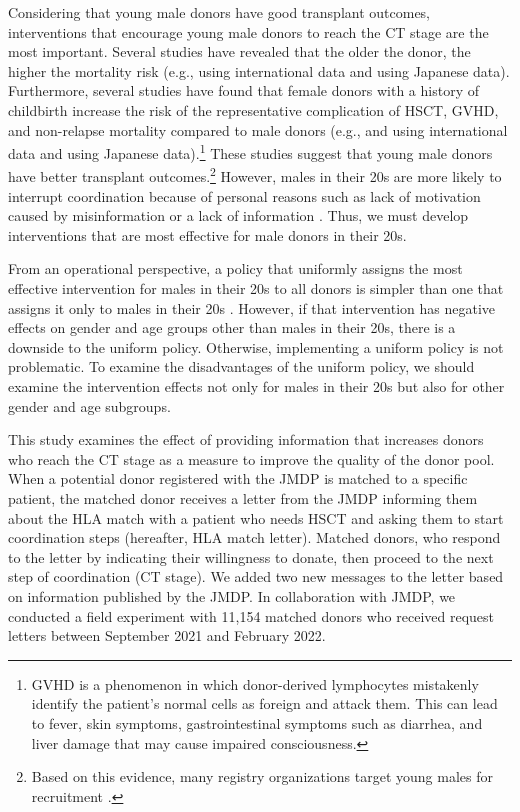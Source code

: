 \documentclass [12pt, a4paper]{article}
\begin{document}
Considering that young male donors have good transplant outcomes, interventions that encourage young male donors to reach the CT stage are the most important. Several studies have revealed that the older the donor, the higher the mortality risk (e.g., \citet{Kollman2016} using international data and \citet{Arai2016} using Japanese data). Furthermore, several studies have found that female donors with a history of childbirth increase the risk of the representative complication of HSCT, GVHD, and non-relapse mortality compared to male donors (e.g., \citet{Loren2006} and \citet{Kollman2016} using international data and \citet{Shinohara2017} using Japanese data).\footnote{GVHD is a phenomenon in which donor-derived lymphocytes mistakenly identify the patient's normal cells as foreign and attack them. This can lead to fever, skin symptoms, gastrointestinal symptoms such as diarrhea, and liver damage that may cause impaired consciousness.} These studies suggest that young male donors have better transplant outcomes.\footnote{Based on this evidence, many registry organizations target young males for recruitment \citep{Fingrut2018}.} However, males in their 20s are more likely to interrupt coordination because of personal reasons such as lack of motivation caused by misinformation or a lack of information  \citep{Hirakawa2018, Kurosawa2022}. Thus, we must develop interventions that are most effective for male donors in their 20s.

From an operational perspective, a policy that uniformly assigns the most effective intervention for males in their 20s to all donors is simpler than one that assigns it only to males in their 20s . However, if that intervention has negative effects on gender and age groups other than males in their 20s, there is a downside to the uniform policy. Otherwise, implementing a uniform policy is not problematic. To examine the disadvantages  of the uniform policy, we should examine the intervention effects not only for males in their 20s but also for other gender and age subgroups.

This study examines the effect of providing information that increases donors who reach the CT stage as a measure to improve the quality of the donor pool. When a potential donor registered with the JMDP is matched to a specific patient, the matched donor receives a letter from the JMDP informing them about the HLA match with a patient who needs HSCT and asking them to start coordination steps (hereafter, HLA match letter). Matched donors, who respond to the letter by indicating their willingness to donate, then proceed to the next step of coordination (CT stage). We added two new messages to the letter based on information published by the JMDP. In collaboration with JMDP, we conducted a field experiment with 11,154 matched donors who received request letters between September 2021 and February 2022.
\end{document}

